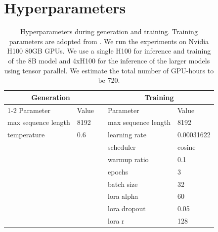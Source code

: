 \begin{table}
\begin{minipage}{\textwidth}
  \section{Hyperparameters}\label{sec:hyperparameter_appendix}
  \centering
  \begin{tabular}{llcll}
    \toprule
    \multicolumn{2}{c}{Generation} &       & \multicolumn{2}{c}{Training}                                    \\
    \cmidrule{1-2}\cmidrule{4-5}
    Parameter                      & Value &                              & Parameter           & Value      \\
    \midrule
    max sequence length            & 8192  &                              & max sequence length & 8192       \\
    temperature                    & 0.6   &                              & learning rate       & 0.00031622 \\
                                   &       &                              & scheduler           & cosine     \\
                                   &       &                              & warmup ratio        & 0.1        \\
                                   &       &                              & epochs              & 3          \\
                                   &       &                              & batch size          & 32         \\
                                   &       &                              & lora alpha          & 60         \\
                                   &       &                              & lora dropout        & 0.05       \\
                                   &       &                              & lora r              & 128        \\
    \bottomrule
  \end{tabular}
  \caption{Hyperparameters during generation and training. Training parameters are adopted from \citet{tribesHyperparameterOptimizationLarge2024}. We run the experiments on Nvidia H100 80GB GPUs. We use a single H100 for inference and training of the 8B model and 4xH100 for the inference of the larger models using tensor parallel. We estimate the total number of GPU-hours to be 720.}
\end{minipage}
\end{table}


